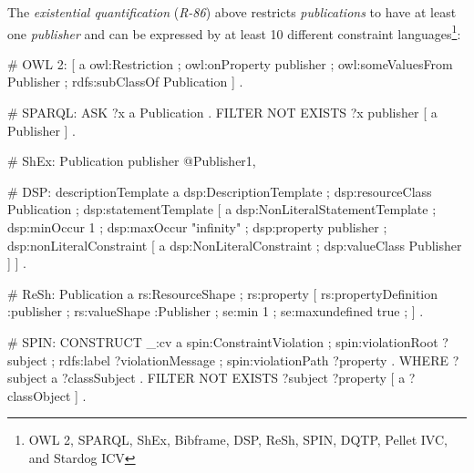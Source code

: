 \documentclass{llncs}
\newcommand{\ms}[1]{\texttt{#1}}
\newenvironment{DL}{
  \vspace{0cm}
	\begin{center}
  \begin{tabular}{r l}

}{
  \end{tabular}
	\end{center}
}
\begin{document}
{The {\em existential quantification} (\emph{R-86})
above restricts \emph{publications} to have at least one \emph{publisher} and can be expressed by at least 10 different constraint languages\footnote{OWL 2, SPARQL, ShEx, Bibframe, DSP, ReSh, SPIN, DQTP, Pellet IVC, and Stardog ICV}:

\begin{ex}
# OWL 2:
[ a owl:Restriction ;
  owl:onProperty publisher ;
  owl:someValuesFrom Publisher ;
  rdfs:subClassOf Publication ] .
	
# SPARQL:
ASK { ?x a Publication . FILTER NOT EXISTS { ?x publisher [ a Publisher ] } . }
	
# ShEx:
Publication {
    publisher @Publisher{1,} }
		
# DSP:
descriptionTemplate a dsp:DescriptionTemplate ;
    dsp:resourceClass Publication ; 
    dsp:statementTemplate [ a dsp:NonLiteralStatementTemplate ;
        dsp:minOccur 1 ; dsp:maxOccur "infinity" ; 
        dsp:property publisher ; 
        dsp:nonLiteralConstraint [ a dsp:NonLiteralConstraint ;
            dsp:valueClass Publisher ] ] .
		
# ReSh:
Publication a rs:ResourceShape ; rs:property [
    rs:propertyDefinition :publisher ;
    rs:valueShape :Publisher ;
    se:min 1 ; se:maxundefined true ; ] .
		
# SPIN:
CONSTRUCT {
    _:cv a spin:ConstraintViolation ; spin:violationRoot ?subject ;
         rdfs:label ?violationMessage ; spin:violationPath ?property . } WHERE 
{ ?subject a ?classSubject . FILTER NOT EXISTS { ?subject ?property [ a ?classObject ] } . }
\end{ex}



}
\end{document}
